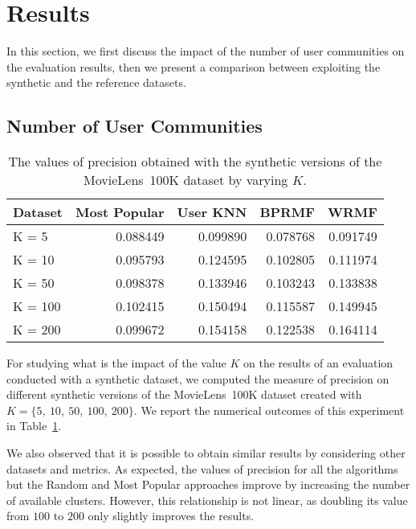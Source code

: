 \section{Results}
\label{syn:sec:results}

In this section, we first discuss the impact of the number of user communities on the evaluation results, then we present a comparison between exploiting the synthetic and the reference datasets.

\subsection{Number of User Communities}
\label{syn:sec:communities}

\begin{table}
\centering
\begin{tabular}{@{}lrrrr@{}}
\toprule
Dataset & Most Popular & User KNN & BPRMF & WRMF \\ \midrule
K = 5 & 0.088449 & 0.099890 & 0.078768 & 0.091749 \\
K = 10 & 0.095793 & 0.124595 & 0.102805 & 0.111974 \\
K = 50 & 0.098378 & 0.133946 & 0.103243 & 0.133838 \\
K = 100 & 0.102415 & 0.150494 & 0.115587 & 0.149945 \\
K = 200 & 0.099672 & 0.154158 & 0.122538 & 0.164114 \\ \bottomrule
\end{tabular}
\caption[Precision obtained by varying the clusters]{The values of precision obtained with the synthetic versions of the MovieLens~100K dataset by varying $K$.}
\label{syn:tab:clusters}
\end{table}

For studying what is the impact of the value $K$ on the results of an evaluation conducted with a synthetic dataset, we computed the measure of precision on different synthetic versions of the MovieLens~100K dataset created with $K = \{5,\ 10,\ 50,\ 100,\ 200\}$. We report the numerical outcomes of this experiment in Table~\ref{syn:tab:clusters}.

We also observed that it is possible to obtain similar results by considering other datasets and metrics. As expected, the values of precision for all the algorithms but the Random and Most Popular approaches improve by increasing the number of available clusters. However, this relationship is not linear, as doubling its value from $100$ to $200$ only slightly improves the results.

